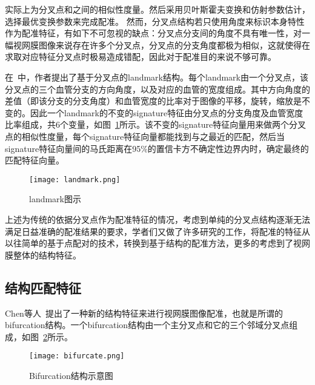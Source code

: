  实际上为分叉点和之间的相似性度量。然后采用贝叶斯霍夫变换和仿射参数估计，选择最优变换参数来完成配准。
然而，分叉点结构若只使用角度来标识本身特性作为配准特征，有如下不可忽视的缺点：分叉点分支间的角度不具有唯一性，对一幅视网膜图像来说存在许多个分叉点，分叉点的分支角度都极为相似，这就使得在求取对应特征分叉点时极易造成错配，因此对于配准目的来说不够可靠。
 
在~\cite{stewart}中，作者提出了基于分叉点的landmark结构。每个landmark由一个分叉点，该分叉点的三个血管分支的方向角度，以及对应的血管的宽度组成。其中方向角度的差值（即该分支的分支角度）和血管宽度的比率对于图像的平移，旋转，缩放是不变的。因此一个landmark的不变的signature特征由分叉点的分支角度及血管宽度比率组成，共6个变量，如图~\ref{landmark}所示。该不变的signature特征向量用来做两个分叉点的相似性度量，每个signature特征向量都能找到与之最近的匹配，然后当signature特征向量间的马氏距离在95$\%$的置信卡方不确定性边界内时，确定最终的匹配特征向量。
  \begin{figure}[ht!]
   \centering
  \texttt{[image: landmark.png]}
  \caption{landmark图示}
    \label{landmark}
 \end{figure}
 
上述为传统的依据分叉点作为配准特征的情况，考虑到单纯的分叉点结构逐渐无法满足日益准确的配准结果的要求，学者们又做了许多研究的工作，将配准的特征从以往简单的基于点配对的技术，转换到基于结构的配准方法，更多的考虑到了视网膜整体的结构特征。
 
 \subsection{结构匹配特征}
 Chen等人~\cite{chen}提出了一种新的结构特征来进行视网膜图像配准，也就是所谓的bifurcation结构。一个bifurcation结构由一个主分叉点和它的三个邻域分叉点组成，如图~\ref{bifurcation}所示。
   \begin{figure}[ht!]
   \centering
  \texttt{[image: bifurcate.png]}
  \caption{Bifurcation结构示意图}
    \label{bifurcation}
 \end{figure}
 
